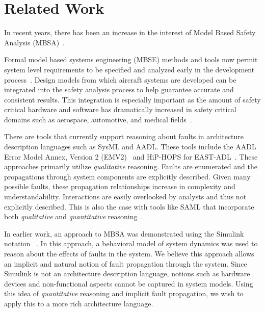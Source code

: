 \section{Related Work}
\label{sec:related_work}

In recent years, there has been an increase in the interest of Model Based Safety Analysis (MBSA)~\cite{Bozzano:2010:DSA:1951720}. 

Formal model based systems engineering (MBSE) methods and tools now permit system level requirements to be specified and analyzed early in the development process~\cite{QFCS15:backes,CIMATTI2015333, NFM2012:CoGaMiWhLaLu, hilt2013:MuWhRaHe, Pajic2012}. Design models from which aircraft systems are developed can be integrated into the safety analysis process to help guarantee accurate and consistent results. This integration is especially important as the amount of safety critical hardware and software has dramatically increased in safety critical domains such as aerospace, automotive, and medical fields~\cite{Stewart17:IMBSA}.

There are tools that currently support reasoning about faults in architecture description languages such as SysML and AADL. These tools include the AADL Error Model Annex, Version 2 (EMV2)~\cite{EMV2} and HiP-HOPS for EAST-ADL~\cite{CHEN201391}. These approaches primarily utilize \textit{qualitative} reasoning. Faults are enumerated and the propagations through system components are explicitly described. Given many possible faults, these propagation relationships increase in complexity and understandability. Interactions are easily overlooked by analysts and thus not explicitly described. This is also the case with tools like SAML that incorporate both \textit{qualitative} and \textit{quantitative} reasoning~\cite{Gudemann:2010:FQQ:1909626.1909813}. 

In earlier work, an approach to MBSA was demonstrated using the Simulink notation~\cite{Joshi05:SafeComp,Joshi05:Dasc,NasaRep:MBSA-Aug05, MathWorks} . In this approach, a behavioral model of system dynamics was used to reason about the effects of faults in the system. We believe this approach allows an implicit and natural notion of fault propagation through the system. Since Simulink is not an architecture description language, notions such as hardware devices and non-functional aspects cannot be captured in system models. Using this idea of \textit{quantitative} reasoning and implicit fault propagation, we wish to apply this to a more rich architecture language. 


